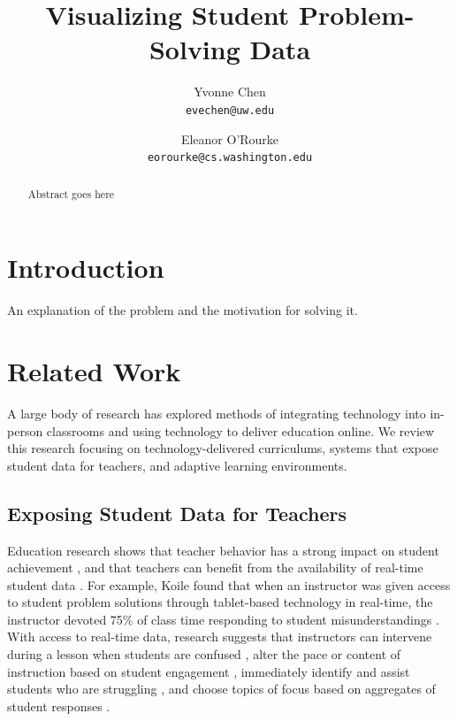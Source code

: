 \documentclass{sigchi}
\begin{document}
\author{
  Yvonne Chen\\
  \texttt{evechen@uw.edu}
  \and
  Eleanor O'Rourke\\
  \texttt{eorourke@cs.washington.edu}
}
\title{Visualizing Student Problem-Solving Data}


\maketitle

\begin{abstract}
Abstract goes here
\end{abstract}




\section{Introduction}
An explanation of the problem and the motivation for solving it.

\section{Related Work}
A large body of research has explored methods of integrating technology into in-person classrooms and using technology to deliver education online. We review this research focusing on technology-delivered curriculums, systems that expose student data for teachers, and adaptive learning environments.

\subsection{Exposing Student Data for Teachers}
Education research shows that teacher behavior has a strong impact on student achievement \cite{Hill2005, Wentzel2002, Reeve2004, Wright1997}, and that teachers can benefit from the availability of real-time student data \cite{Balaam2010, Koile2006, Lazar2007}. For example, Koile found that when an instructor was given access to student problem solutions through tablet-based technology in real-time, the instructor devoted 75\% of class time responding to student misunderstandings \cite{Koile2006}. With access to real-time data, research suggests that instructors can intervene during a lesson when students are confused \cite{Hickey2014}, alter the pace or content of instruction based on student engagement \cite{Balaam2010}, immediately identify and assist students who are struggling \cite{Lazar2007}, and choose topics of focus based on aggregates of student responses \cite{Koile2006}. 
\end{document}
